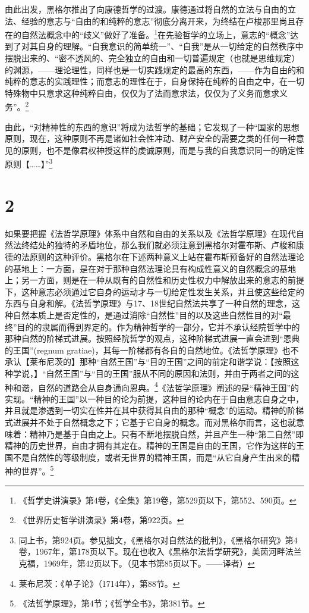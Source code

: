 由此出发，黑格尔推出了向康德哲学的过渡。康德通过将自然的立法与自由的立法、经验的意志与“自由的和纯粹的意志”彻底分离开来，为终结在卢梭那里尚且存在的自然法概念中的“歧义”做好了准备。\footnote{《哲学史讲演录》第4卷，《全集》第19卷，第529页以下，第552、590页。}在先验哲学的立场上，意志的“概念”达到了对其自身的理解。“自我意识的简单统一”、“自我”是从一切给定的自然秩序中摆脱出来的、“密不透风的、完全独立的自由和一切普遍规定（也就是思维规定）的渊源，——理论理性，同样也是一切实践规定的最高的东西，——作为自由的和纯粹的意志的实践理性；而意志的理性在于，自身保持在纯粹的自由之中，在一切特殊物中只意求这种纯粹自由，仅仅为了法而意求法，仅仅为了义务而意求义务”。\footnote{《世界历史哲学讲演录》第4卷，第922页。}

由此，“对精神性的东西的意识”将成为法哲学的基础；它发现了一种“国家的思想原则，现在，这种原则不再是诸如社会性冲动、财产安全的需要之类的任何一种意见的原则，也不是像君权神授这样的虔诚原则，而是与我的自我意识同一的确定性原则【……】”\footnote{同上书，第924页。参见拙文，《黑格尔对自然法的批判》，《黑格尔研究》第4卷，1967年，第178页以下。现在也收入《黑格尔法哲学研究》，美茵河畔法兰克福，1969年，第42页以下。（见本书第85页以下。——译者）}

\section*{2}

如果要把握《法哲学原理》体系中自然和自由的关系以及《法哲学原理》在现代自然法终结处的独特的矛盾地位，那么我们就必须注意到黑格尔对霍布斯、卢梭和康德的法原则的这种评价。黑格尔在下述两种意义上站在霍布斯预备好的自然法理论的基地上：一方面，是在对于那种自然法理论具有构成性意义的自然概念的基地上；另一方面，则是在一种从既有的自然性和历史性权力中解放出来的意志的前提下，这种意志必须通过它自身的运动才与一切给定性发生关系，并且使这些给定的东西与自身和解。《法哲学原理》与17、18世纪自然法共享了一种自然的理念，这种自然本质上是否定性的，是通过消除“自然性”目的以及这些自然性目的对“最终”目的的隶属而得到界定的。作为精神哲学的一部分，它并不承认经院哲学中的那种自然的阶梯式进展。按照经院哲学的观点，这种阶梯式进展一直会进到“恩典的王国”(regnum gratiae)，其每一阶梯都有各自的自然地位。《法哲学原理》也不承认【莱布尼茨的】那种“自然王国”与“目的王国”之间的前定和谐学说：【按照这种学说，】“自然王国”与“目的王国”服从不同的原因和法则，并由于两者之间的这种和谐，自然的道路会从自身通向恩典。\footnote{莱布尼茨：《单子论》（1714年），第88节。}《法哲学原理》阐述的是“精神王国”的实现。“精神的王国”以一种目的论为前提，这种目的论内在于自由意志自身之中，并且就是渗透到一切实在性并在其中获得其自由的那种“概念”的运动。精神的阶梯式进展并不处于自然概念之下；它基于它自身的概念。而对黑格尔而言，这也就意味着：精神乃是基于自由之上。只有不断地摆脱自然，并且产生一种“第二自然”即精神的历史世界，自由才拥有其定在。精神的王国是自由的王国，它作为这样的王国不是自然性的等级制度，或者无世界的精神王国，而是“从它自身产生出来的精神的世界”。\footnote{《法哲学原理》，第4节；《哲学全书》，第381节。}

